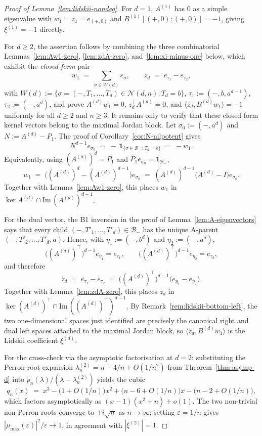 \documentclass{amsart}
\theoremstyle{definition}
\theoremstyle{remark}
\begin{document}
\begin{proof}[Proof of Lemma~\ref{lem:lidskii-nondeg}]
For $d = 1$, $A^{(1)}$ has $0$ as a simple eigenvalue with
$w_1 = z_1 = e_{(+, 0)}$ and $B^{(1)}[(+, 0); (+, 0)] = -1$,
giving $\xi^{(1)} = -1$ directly.

For $d \ge 2$, the assertion follows by combining the three
combinatorial Lemmas~\ref{lem:Aw1-zero}, \ref{lem:zdA-zero},
and~\ref{lem:xi-minus-one} below, which exhibit the
\emph{closed-form} pair
\begin{equation}\label{eq:closed-form-w1-zd}
  w_1 \;=\; \sum_{\sigma \in W(d)} e_{\sigma},
  \qquad
  z_d \;=\; e_{\tau_1} - e_{\tau_2},
\end{equation}
with $W(d) := \{\sigma = (-, T_1, \ldots, T_d) \in
\mathcal{N}(d, n) : T_d = b\}$, $\tau_1 := (-, b, a^{d-1})$,
$\tau_2 := (-, a^d)$, and prove $A^{(d)} w_1 = 0$,
$z_d^\top A^{(d)} = 0$, and
$\langle z_d, B^{(d)} w_1\rangle = -1$ uniformly for all
$d \ge 2$ and $n \ge 3$.  It remains only to verify that these
closed-form kernel vectors belong to the maximal Jordan block.
Let $\sigma_0 := (-, a^d)$ and $N := A^{(d)} - P_1$.  The proof
of Corollary~\ref{cor:N-nilpotent} gives
\[
  N^{d-1} e_{\sigma_0}
  \;=\; -\,\mathbf{1}_{\{\sigma \in \mathcal{B}_- :\, T_d = b\}}
  \;=\; -w_1.
\]
Equivalently, using $(A^{(d)})^d=P_1$ and
$P_1 e_{\sigma_0}=\mathbf{1}_{\mathcal{B}_-}$,
\[
  w_1
  \;=\; \bigl((A^{(d)})^d-(A^{(d)})^{d-1}\bigr)e_{\sigma_0}
  \;=\; (A^{(d)})^{d-1}\bigl(A^{(d)}-I\bigr)e_{\sigma_0}.
\]
Together with Lemma~\ref{lem:Aw1-zero}, this places
$w_1$ in $\ker A^{(d)}\cap \mathrm{Im}\,(A^{(d)})^{d-1}$.

For the dual vector, the B1 inversion in the proof of
Lemma~\ref{lem:A-eigenvectors} says that every child
$(-,T'_1,\ldots,T'_d)\in\mathcal{B}_-$ has the unique
A-parent $(-,T'_2,\ldots,T'_d,a)$.  Hence, with
$\eta_1:=(-,b^d)$ and $\eta_2:=(-,a^d)$,
\[
  \bigl((A^{(d)})^\top\bigr)^{d-1} e_{\eta_1}=e_{\tau_1},
  \qquad
  \bigl((A^{(d)})^\top\bigr)^{d-1} e_{\eta_2}=e_{\tau_2},
\]
and therefore
\[
  z_d
  \;=\; e_{\tau_1}-e_{\tau_2}
  \;=\; \bigl((A^{(d)})^\top\bigr)^{d-1}
        \bigl(e_{\eta_1}-e_{\eta_2}\bigr).
\]
Together with Lemma~\ref{lem:zdA-zero}, this places
$z_d$ in $\ker (A^{(d)})^\top\cap
\mathrm{Im}\,((A^{(d)})^\top)^{d-1}$.
By Remark~\ref{rem:lidskii-bottom-left}, the two one-dimensional
spaces just identified are precisely the canonical right and dual
left spaces attached to the maximal Jordan block, so
$\langle z_d, B^{(d)}w_1\rangle$ is the Lidskii coefficient
$\xi^{(d)}$.

For the cross-check via the asymptotic factorisation at $d = 2$:
substituting the Perron-root expansion $\lambda_n^{(2)} = n -
4/n + O(1/n^2)$ from Theorem~\ref{thm:asymp-d} into
$p_n(\lambda)/(\lambda - \lambda_n^{(2)})$ yields the cubic
\[
  q_n(x) \;=\; x^3 - \bigl(1 + O(1/n)\bigr) x^2
    + \bigl(n - 6 + O(1/n)\bigr) x - \bigl(n - 2 + O(1/n)\bigr),
\]
which factors asymptotically as $(x - 1)(x^2 + n) + o(1)$.  The
two non-trivial non-Perron roots converge to $\pm i\sqrt{n}$ as
$n \to \infty$; setting $\varepsilon = 1/n$ gives
$|\mu_{\max}(\varepsilon)|^2 / \varepsilon \to 1$, in agreement
with $|\xi^{(2)}| = 1$.
\end{proof}
\end{document}
